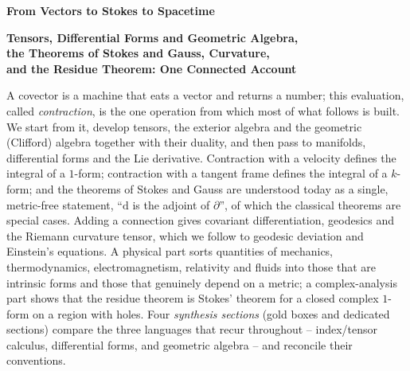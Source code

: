 \documentclass[11pt,a4paper]{article}
\numberwithin{equation}{section}
\theoremstyle{definition}
\theoremstyle{plain}
\newcommand{\dd}{\mathrm{d}}
\begin{document}
\begin{center}
{\LARGE\bfseries From Vectors to Stokes to Spacetime\par}
\vspace{0.6em}
{\Large\bfseries Tensors, Differential Forms and Geometric Algebra,\\[2pt]
the Theorems of Stokes and Gauss, Curvature,\\[2pt]
and the Residue Theorem: One Connected Account\par}
\end{center}
\vspace{0.4em}

\begin{center}
\begin{minipage}{0.88\textwidth}
\par\vspace{0.4em}
\small\raggedright\setlength{\parindent}{1.5em}\noindent
A covector is a machine that eats a vector and returns a number; this evaluation, called
\emph{contraction}, is the one operation from which most of what follows is built. We start from it,
develop tensors, the exterior algebra and the geometric (Clifford) algebra together with their duality,
and then pass to manifolds, differential forms and the Lie derivative. Contraction with a velocity
defines the integral of a $1$-form; contraction with a tangent frame defines the integral of a
$k$-form; and the theorems of Stokes and Gauss are understood today as a single, metric-free
statement, ``$\dd$ is the adjoint of $\partial$'', of which the classical theorems are special cases.
Adding a connection gives covariant differentiation, geodesics and the Riemann curvature tensor,
which we follow to geodesic deviation and Einstein's equations. A physical part sorts quantities
of mechanics, thermodynamics, electromagnetism, relativity and fluids into those that are intrinsic
forms and those that genuinely depend on a metric; a complex-analysis part shows that the residue
theorem is Stokes' theorem for a closed complex $1$-form on a region with holes. Four \emph{synthesis
sections} (gold boxes and dedicated sections) compare the three languages that recur throughout --
index/tensor calculus, differential forms, and geometric algebra -- and reconcile their conventions.
\end{minipage}
\end{center}

\vspace{0.8em}
\tableofcontents
\clearpage
\end{document}
